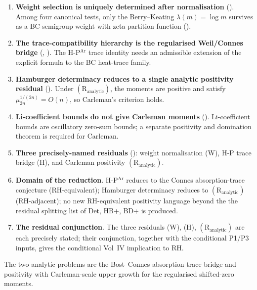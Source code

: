 \begin{enumerate}
\item \textbf{Weight selection is uniquely determined after
normalisation}
(). Among four
canonical tests, only the Berry--Keating \(\lambda(m)=\log m\)
survives as a BC semigroup weight with zeta partition function
().
\item \textbf{The trace-compatibility hierarchy is the regularised
Weil/Connes bridge}
(,
). The
H-P\(^{\mathrm{Ar}}\) trace identity needs an admissible extension of
the explicit formula to the BC heat-trace family.
\item \textbf{Hamburger determinacy reduces to a single analytic
positivity residual}
(). Under
\((\mathrm{R}_{\mathrm{analytic}})\), the moments are positive and
satisfy \(\mu_{2n}^{1/(2n)}=O(n)\), so Carleman's criterion holds.
\item \textbf{Li-coefficient bounds do not give Carleman moments}
().
Li-coefficient bounds are oscillatory zero-sum bounds; a separate
positivity and domination theorem is required for Carleman.
\item \textbf{Three precisely-named residuals}
(): weight
normalisation (W), H-P trace bridge (H), and Carleman positivity
\((\mathrm{R}_{\mathrm{analytic}})\).
\item \textbf{Domain of the reduction}. H-P\(^{\mathrm{Ar}}\) reduces to
the Connes absorption-trace conjecture (RH-equivalent); Hamburger
determinacy reduces to \((\mathrm{R}_{\mathrm{analytic}})\)
(RH-adjacent); no new RH-equivalent positivity language beyond the
the residual splitting list of Det, HB+, BD+ is produced.
\item \textbf{The residual conjunction}. The three residuals
(W), (H), \((\mathrm{R}_{\mathrm{analytic}})\) are each precisely
stated; their conjunction, together with the conditional P1/P3 inputs,
gives the conditional Vol~IV implication to RH.
\end{enumerate}

The two analytic problems are the Bost--Connes absorption-trace
bridge and positivity with Carleman-scale upper growth for the
regularised shifted-zero moments.
